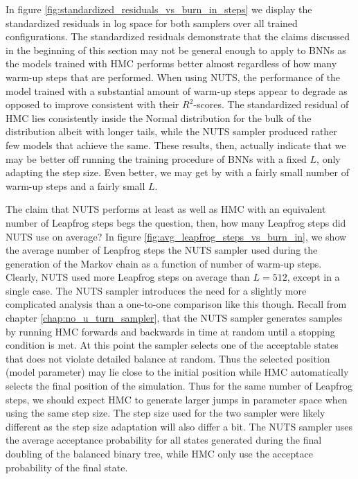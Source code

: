 In figure \ref{fig:standardized_residuals_vs_burn_in_steps} we display the standardized residuals in log space for both samplers over all trained configurations. 
The standardized residuals demonstrate that the claims discussed in the beginning of this section may not be general enough to apply to BNNs as the models trained with HMC performs better almost regardless of how many warm-up steps that are performed. When using NUTS, the performance of the model trained with a substantial amount of warm-up steps appear to degrade as opposed to improve consistent with their $R^2$-scores. The standardized residual of HMC lies consistently inside the Normal distribution for the bulk of the distribution albeit with longer tails, while the NUTS sampler produced rather few models that achieve the same. These results, then, actually indicate that we may be better off running the training procedure of BNNs with a fixed $L$, only adapting the step size. Even better, we may get by with a fairly small number of warm-up steps and a fairly small $L$. 

The claim that NUTS performs at least as well as HMC with an equivalent number of Leapfrog steps begs the question, then, how many Leapfrog steps did NUTS use on average? In figure \ref{fig:avg_leapfrog_steps_vs_burn_in}, we show the average number of Leapfrog steps the NUTS sampler used during the generation of the Markov chain as a function of number of warm-up steps. Clearly, NUTS used more Leapfrog steps on average than $L = 512$, except in a single case. The NUTS sampler introduces the need for a slightly more complicated analysis than a one-to-one comparison like this though. Recall from chapter \ref{chap:no_u_turn_sampler}, that the NUTS sampler generates samples by running HMC forwards and backwards in time at random until a stopping condition is met. At this point the sampler selects one of the acceptable states that does not violate detailed balance at random. Thus the selected position (model parameter) may lie close to the initial position while HMC automatically selects the final position of the simulation. Thus for the same number of Leapfrog steps, we should expect HMC to generate larger jumps in parameter space when using the same step size. The step size used for the two sampler were likely different as the step size adaptation will also differ a bit. The NUTS sampler uses the average acceptance probability for all states generated during the final doubling of the balanced binary tree, while HMC only use the acceptace probability of the final state.

